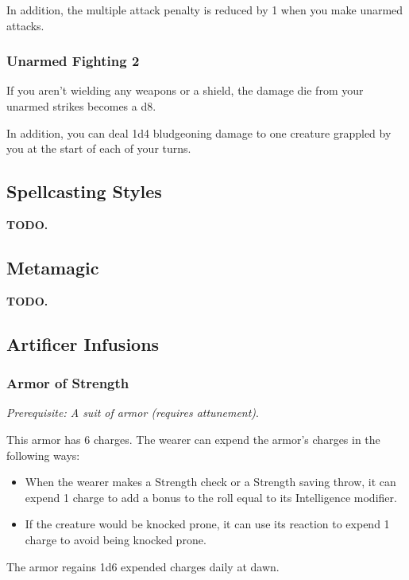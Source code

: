         In addition, the multiple attack penalty is reduced by 1 when you make unarmed attacks.
    \subsubsection{Unarmed Fighting 2}
        If you aren't wielding any weapons or a shield, the damage die from your unarmed strikes becomes a d8.

        In addition, you can deal 1d4 bludgeoning damage to one creature grappled by you at the start of each of your turns.

\subsection*{Spellcasting Styles} \label{ssec::spellcastingstyles}
    \textbf{TODO.}


\subsection*{Metamagic} \label{ssec::metamagic}
    \textbf{TODO.} %

\subsection*{Artificer Infusions} \label{ssec::artificerinfusions}
    \subsubsection{Armor of Strength}
        \textit{Prerequisite: A suit of armor (requires attunement)}.

        This armor has 6 charges. The wearer can expend the armor's charges in the following ways:
        \begin{itemize}
            \item When the wearer makes a Strength check or a Strength saving throw, it can expend 1 charge to add a bonus to the roll equal to its Intelligence modifier.
            \item If the creature would be knocked prone, it can use its reaction to expend 1 charge to avoid being knocked prone.
        \end{itemize}
        The armor regains 1d6 expended charges daily at dawn.
